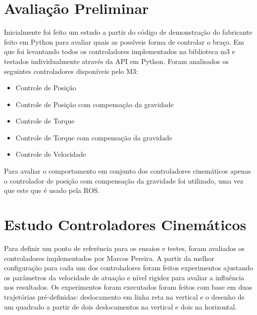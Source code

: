 

\section{Avaliação Preliminar}

Inicialmente foi feito um estudo a partir do código de demonstração do fabricante feito em Python para avaliar quais as possíveis forma de controlar o braço. Em que foi levantando todos os controladores implementados na biblioteca m3 e testados individualmente através da API em Python. Foram analisados os seguintes controladores disponíveis pelo M3:

\begin{itemize}
    \item Controle de Posição
    \item Controle de Posição com compensação da gravidade
    \item Controle de Torque
    \item Controle de Torque com compensação da gravidade
    \item Controle de Velocidade
\end{itemize}


Para avaliar o comportamento em conjunto dos controladores cinemáticos apenas o controlador de posição com compensação da gravidade foi utilizado, uma vez que este que é usado pela ROS.

\section{Estudo Controladores Cinemáticos}

Para definir um ponto de referência para os ensaios e testes, foram avaliados os controladores implementados por Marcos Pereira. A partir da melhor configuração para cada um dos controladores foram feitos experimentos ajustando os parâmetros da velocidade de atuação e nível rigidez para avaliar a influência nos resultados. Os experimentos foram executados foram feitos com base em duas trajetórias pré-definidas: deslocamento em linha reta na vertical e o desenho de um quadrado a partir de dois deslocamentos na vertical e dois na horizontal.

